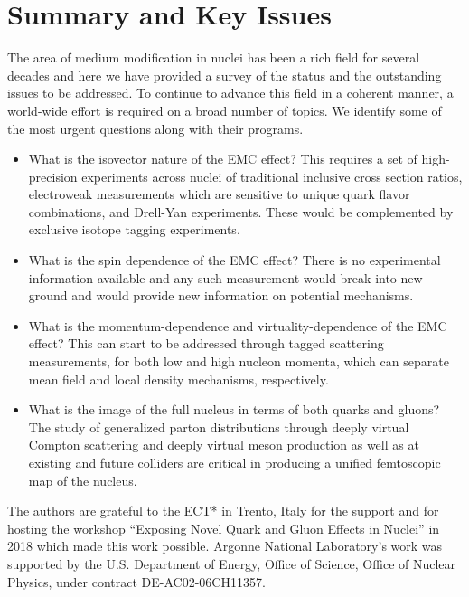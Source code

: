 \section{Summary and Key Issues\label{sec:conclusion}}
%
The area of medium modification in nuclei has been a rich field for several decades and here we have provided a survey of the status and the outstanding issues to be addressed.  To continue to advance this field in a coherent manner, a world-wide effort is required on a broad number of topics.  We identify some of the most urgent questions along with their programs.

\begin{itemize}
    \item{What is the isovector nature of the EMC effect?  This requires a set of high-precision experiments across nuclei of traditional inclusive cross section ratios, electroweak measurements which are sensitive to unique quark flavor combinations, and Drell-Yan experiments.  These would be complemented by exclusive isotope tagging experiments.}
    \item{What is the spin dependence of the EMC effect?  There is no experimental information available and any such measurement would break into new ground and would provide new information on potential mechanisms.}
    \item{What is the momentum-dependence and virtuality-dependence of the EMC effect?  This can start to be addressed through tagged scattering measurements, for both low and high nucleon momenta, which can separate mean field and local density mechanisms, respectively.}
    \item{What is the image of the full nucleus in terms of both quarks and gluons?  The study of generalized parton distributions through deeply virtual Compton scattering and deeply virtual meson production as well as at existing and future colliders are critical in producing a unified femtoscopic map of the nucleus.}
\end{itemize}

\begin{acknowledgments}
The authors are grateful to the ECT* in Trento, Italy for the support and for hosting the workshop ``Exposing Novel Quark and Gluon Effects in Nuclei'' in 2018 which made this work possible.  Argonne National Laboratory's work was supported by the U.S. Department of Energy, Office of Science, Office of Nuclear Physics, under contract DE-AC02-06CH11357.  
\end{acknowledgments}
